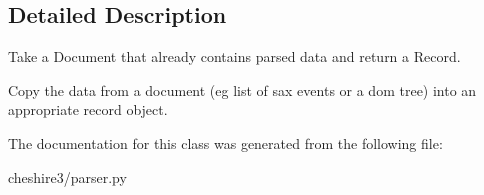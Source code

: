 \subsection{Detailed Description}
\begin{DoxyVerb}Take a Document that already contains parsed data and return a Record.

Copy the data from a document (eg list of sax events or a dom tree) into
an appropriate record object.
\end{DoxyVerb}
 

The documentation for this class was generated from the following file\-:\begin{DoxyCompactItemize}
\item 
cheshire3/parser.\-py\end{DoxyCompactItemize}
